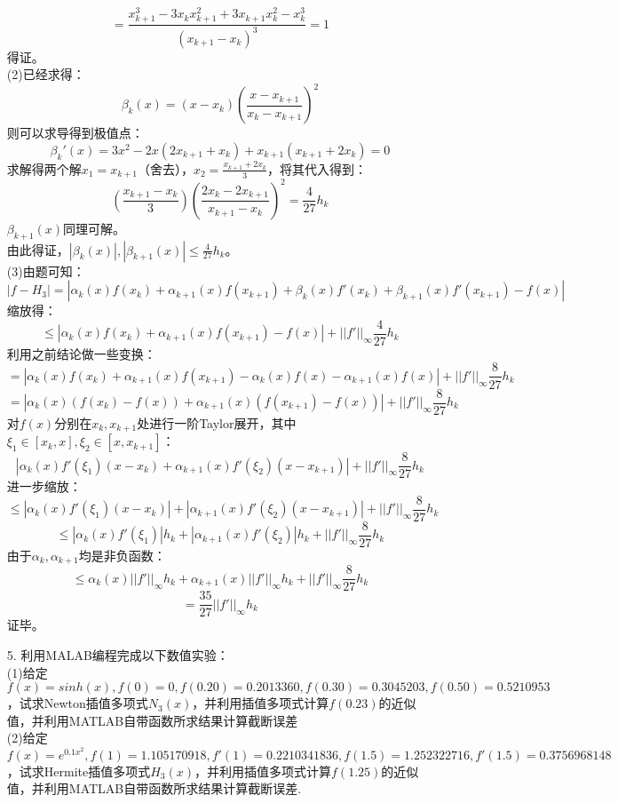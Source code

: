 \documentclass{article}
\begin{document}
\begin{itemize}
		$$ = \frac{x_{k+1}^{3} - 3x_{k}x_{k+1}^2 + 3x_{k+1}x_{k}^{2} - x_{k}^{3}}{(x_{k+1} - x_{k})^{3}} = 1$$
		得证。\\
		(2)已经求得：
		$$\beta_{k}(x) =  (x - x_{k})\left(\frac{x-x_{k+1}}{x_{k} - x_{k+1}}\right)^{2}$$
		则可以求导得到极值点：
		$$\beta_{k}'(x) = 3x^{2} - 2x(2x_{k+1} + x_{k}) + x_{k+1}(x_{k+1} + 2x_{k}) = 0$$
		求解得两个解$x_{1} = x_{k+1}$（舍去），$x_{2} = \frac{x_{k+1} + 2x_{k}}{3}$，将其代入得到：
		$$\left(\frac{x_{k+1} - x_{k}}{3}\right)\left(\frac{2x_{k} - 2x_{k+1}}{x_{k+1} - x_{k}}\right)^{2} = \frac{4}{27}h_{k}$$
		$\beta_{k+1}(x)$同理可解。\\
		由此得证，$\left|\beta_{k}(x)\right|,\left|\beta_{k + 1}(x)\right| \le \frac{4}{27}h_{k}$。\\
		(3)由题可知：
		$$|f - H_{3}|=|\alpha_{k}(x)f(x_{k}) + \alpha_{k+1}(x)f(x_{k+1}) + \beta_{k}(x)f'(x_{k}) + \beta_{k+1}(x)f'(x_{k+1}) - f(x)|$$
		缩放得：
		$$\le |\alpha_{k}(x)f(x_{k}) + \alpha_{k+1}(x)f(x_{k+1}) - f(x)| + ||f'||_{\infty}\frac{4}{27}h_{k}$$
		利用之前结论做一些变换：
		$$=|\alpha_{k}(x)f(x_{k}) + \alpha_{k+1}(x)f(x_{k+1}) - \alpha_{k}(x)f(x) -  \alpha_{k+1}(x)f(x)| + ||f'||_{\infty}\frac{8}{27}h_{k}$$
		$$=|\alpha_{k}(x)(f(x_{k}) - f(x)) + \alpha_{k+1}(x)(f(x_{k+1}) - f(x))|  + ||f'||_{\infty}\frac{8}{27}h_{k}$$
		对$f(x)$分别在$x_{k},x_{k+1}$处进行一阶Taylor展开，其中$\xi_{1}\in[x_{k}, x], \xi_{2} \in [x, x_{k+1}]$：
		$$|\alpha_{k}(x)f'(\xi_{1}) (x - x_{k})+ \alpha_{k+1}(x)f'(\xi_{2})(x- x_{k+1})|  + ||f'||_{\infty}\frac{8}{27}h_{k}$$
		进一步缩放：
		$$\le |\alpha_{k}(x)f'(\xi_{1}) (x - x_{k}) |+ |\alpha_{k+1}(x)f'(\xi_{2})(x- x_{k+1})|  + ||f'||_{\infty}\frac{8}{27}h_{k}$$
		$$\le |\alpha_{k}(x)f'(\xi_{1})|h_{k}+ |\alpha_{k+1}(x)f'(\xi_{2})|h_{k}  + ||f'||_{\infty}\frac{8}{27}h_{k}$$
		由于$\alpha_{k}, \alpha_{k + 1}$均是非负函数：
		$$\le \alpha_{k}(x)||f'||_{\infty}h_{k}+ \alpha_{k+1}(x)||f'||_{\infty}h_{k}  + ||f'||_{\infty}\frac{8}{27}h_{k}$$
		$$=\frac{35}{27}||f'||_{\infty}h_{k}$$
		证毕。\\
		\item[5.]利用MALAB编程完成以下数值实验：\\
		(1)给定$f(x) = sinh(x), f(0) = 0, f(0.20) = 0.2013360, f(0.30) = 0.3045203,
		f(0.50) = 0.5210953$，试求Newton插值多项式$N_{3}(x)$，并利用插值多项式计算$f(0.23)$的近似值，并利用MATLAB自带函数所求结果计算截断误差\\
		(2)给定$f(x) = e^{0.1x^{2}}, f(1) = 1.105170918, f′(1) = 0.2210341836, f(1.5) = 1.252322716,f′(1.5) = 0.3756968148$，试求Hermite插值多项式$H_{3}(x)$，并利用插值多项式计算$f(1.25)$的近似值，并利用MATLAB自带函数所求结果计算截断误差.\\\\

\end{itemize}
\end{document}
